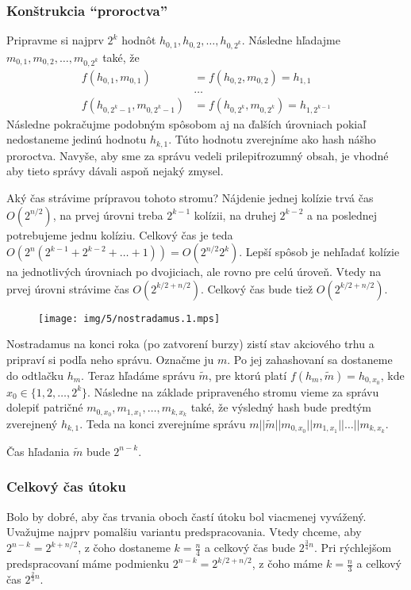 \subsubsection{Konštrukcia ``proroctva''}

Pripravme si najprv $2^k$ hodnôt $h_{0,1}, h_{0,2}, \dots, h_{0,2^k}$.
Následne hľadajme $m_{0,1}, m_{0,2}, \dots, m_{0,2^k}$ také, že
\begin{align*}
    f(h_{0,1}, m_{0,1}) &= f(h_{0,2}, m_{0,2}) = h_{1,1} \\
  &  \dots \\
    f(h_{0,2^k-1}, m_{0,2^k-1}) &= f(h_{0,2^k}, m_{0,2^k}) = h_{1,
        2^{k-1}} 
\end{align*}
Následne pokračujme podobným spôsobom aj na ďalších úrovniach
pokiaľ nedostaneme jedinú hodnotu $h_{k,1}$.
Túto hodnotu zverejníme ako hash nášho proroctva.
Navyše, aby sme za správu vedeli \clqq prilepiť\crqq rozumný obsah,
je vhodné aby tieto správy dávali aspoň nejaký zmysel.

Aký čas strávime prípravou tohoto stromu?
Nájdenie jednej kolízie trvá čas $O(2^{n/2})$, na prvej úrovni treba 
$2^{k-1}$ kolízii, na druhej $2^{k-2}$ a na poslednej
potrebujeme jednu kolíziu. Celkový čas je teda
$O(2^n (2^{k-1} + 2^{k-2} + \dots + 1)) = O(2^{n/2} 2^k)$.
Lepší spôsob je nehľadať kolízie na jednotlivých úrovniach po dvojiciach,
ale rovno pre celú úroveň.
Vtedy na prvej úrovni strávime čas $O(2^{k/2 + n/2})$. 
Celkový čas bude tiež $O(2^{k/2 + n/2})$.

\begin{figure}[h]
    \centering
    \texttt{[image: img/5/nostradamus.1.mps]}
\end{figure}

Nostradamus na konci roka (po zatvorení burzy) zistí stav akciového
trhu a pripraví si podľa neho správu.
Označme ju $m$. Po jej zahashovaní sa dostaneme do odtlačku
$h_m$. Teraz hľadáme správu $\tilde{m}$, pre ktorú platí
$f(h_m, \tilde{m}) = h_{0,x_0}$, kde $x_0 \in \{1, 2, \dots, 2^k\}$.
Následne na základe pripraveného stromu vieme za správu dolepiť patričné 
$m_{0,x_0}, m_{1,x_1}, \dots, m_{k,x_k}$ také, že
výsledný hash bude predtým zverejnený $h_{k,1}$.
Teda na konci zverejníme správu 
$m || \tilde{m} || m_{0,x_0} || m_{1,x_1} || \dots || m_{k, x_k}$.

Čas hľadania $\tilde{m}$ bude $2^{n-k}$.

\subsubsection{Celkový čas útoku}
Bolo by dobré, aby čas trvania oboch častí útoku bol viacmenej vyvážený. 
Uvažujme najprv pomalšiu variantu predspracovania.
Vtedy chceme, aby $2^{n-k} = 2^{k+n/2}$, z čoho dostaneme
$k=\frac{n}{4}$ a celkový čas bude $2^{\frac{3}{4} n}$.
Pri rýchlejšom predspracovaní máme podmienku $2^{n-k} = 2^{k/2 + n/2}$,
z čoho máme $k = \frac{n}{3}$ a celkový čas $2^{\frac{2}{3}n}$.

